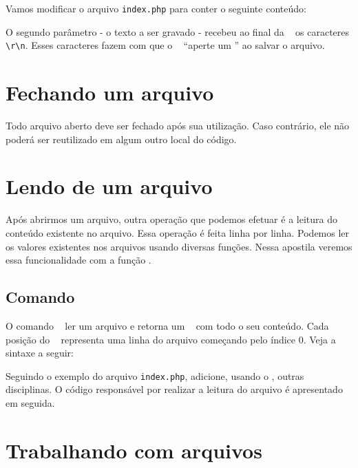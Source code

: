 Vamos modificar o arquivo \texttt{index.php} para conter o seguinte conteúdo:



O segundo parâmetro - o texto a ser gravado - recebeu ao final da \tipostring~ 
os caracteres \texttt{\textbackslash r\textbackslash n}. Esses caracteres fazem com 
que o \php~ ``aperte um \enter'' ao salvar o arquivo.

\section{Fechando um arquivo}
\label{fechando-um-arquivo}

Todo arquivo aberto deve ser fechado após sua utilização. Caso contrário, ele não 
poderá ser reutilizado em algum outro local do código.

\section{Lendo de um arquivo}
\label{lendo-de-um-arquivo}

Após abrirmos um arquivo, outra operação que podemos efetuar é a leitura do conteúdo 
existente no arquivo. Essa operação é feita linha por linha. Podemos ler os 
valores existentes nos arquivos usando diversas funções. Nessa apostila 
veremos essa funcionalidade com a função \funcaofile. 

\subsection{Comando \funcaofile}
\label{comando-file}

O comando \funcaofile~ ler um arquivo e retorna um \tipoarray~ com todo o seu conteúdo.
Cada posição do \tipoarray~ representa uma linha do arquivo começando pelo índice
0. Veja a sintaxe a seguir:



Seguindo o exemplo do arquivo \texttt{index.php}, adicione, usando o \sublime,
outras disciplinas. O código responsável por realizar a leitura do arquivo é
apresentado em seguida.




\section{Trabalhando com arquivos \csvextensao}
\label{trabalhando-com-arquivos-csv}

